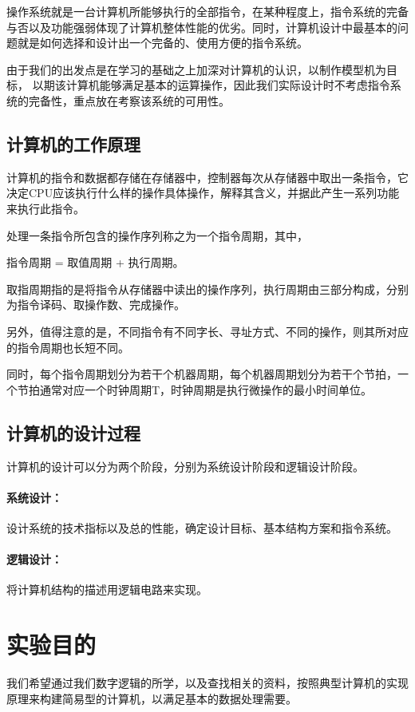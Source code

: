 \documentclass[UTF8]{ctexart}
\begin{document}
    操作系统就是一台计算机所能够执行的全部指令，在某种程度上，指令系统的完备与否以及功能强弱体现了计算机整体性能的优劣。同时，计算机设计中最基本的问题就是如何选择和设计出一个完备的、使用方便的指令系统。

    由于我们的出发点是在学习的基础之上加深对计算机的认识，以制作模型机为目标， 以期该计算机能够满足基本的运算操作，因此我们实际设计时不考虑指令系统的完备性，重点放在考察该系统的可用性。

    \subsection{计算机的工作原理}
    计算机的指令和数据都存储在存储器中，控制器每次从存储器中取出一条指令，它决定CPU应该执行什么样的操作具体操作，解释其含义，并据此产生一系列功能来执行此指令。

    处理一条指令所包含的操作序列称之为一个指令周期，其中，

    \qquad \qquad 指令周期 = 取值周期 + 执行周期。

    取指周期指的是将指令从存储器中读出的操作序列，执行周期由三部分构成，分别为指令译码、取操作数、完成操作。

    另外，值得注意的是，不同指令有不同字长、寻址方式、不同的操作，则其所对应的指令周期也长短不同。

    同时，每个指令周期划分为若干个机器周期，每个机器周期划分为若干个节拍，一个节拍通常对应一个时钟周期T，时钟周期是执行微操作的最小时间单位。

    \subsection{计算机的设计过程}
    计算机的设计可以分为两个阶段，分别为系统设计阶段和逻辑设计阶段。

    \paragraph{系统设计：} 设计系统的技术指标以及总的性能，确定设计目标、基本结构方案和指令系统。

    \paragraph{逻辑设计：} 将计算机结构的描述用逻辑电路来实现。
    \newpage

    \section{实验目的}
    我们希望通过我们数字逻辑的所学，以及查找相关的资料，按照典型计算机的实现原理来构建简易型的计算机，以满足基本的数据处理需要。
\end{document}
